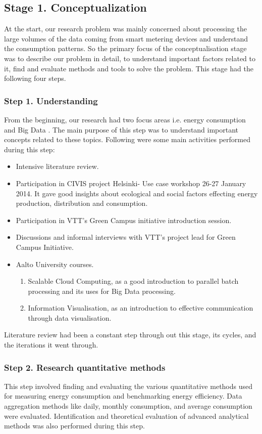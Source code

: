 \subsection{Stage 1. Conceptualization } \label{concept}
At the start, our research problem was mainly concerned about processing the large volumes of the data coming from smart metering devices and understand the consumption patterns. So the primary focus of the conceptualisation stage was to describe our problem in detail, to understand important factors related to it, find and evaluate methods and tools to solve the problem. This stage had the following four steps.
\subsubsection{Step 1. Understanding} 
From the beginning, our research had two focus areas i.e. energy consumption and Big Data . The main purpose of this step was to understand important concepts related to these topics. Following were some main activities performed during this step:
\begin{itemize}
\item Intensive literature review.
\item Participation in CIVIS project Helsinki- Use case workshop 26-27 January 2014. It gave good insights about ecological and social factors effecting energy production, distribution and consumption.
\item Participation in VTT's Green Campus initiative introduction session.
\item Discussions and informal interviews with VTT's project lead for Green Campus Initiative.
\item Aalto University courses.
	\begin{enumerate}
	    \item Scalable Cloud Computing, as a good introduction to parallel batch processing and its uses for Big Data processing.
	    \item Information Visualisation, as an introduction to effective communication through data visualisation.
	  \end{enumerate}      
\end{itemize}

Literature review had been a constant step through out this stage, its cycles, and the iterations it went through.
\subsubsection{Step 2. Research quantitative methods} \label{qm}
This step involved finding and evaluating the various quantitative methods used for measuring energy consumption and benchmarking energy efficiency. Data aggregation methods like daily, monthly consumption, and average consumption were evaluated. Identification and theoretical evaluation of advanced analytical methods was also performed during this step.

